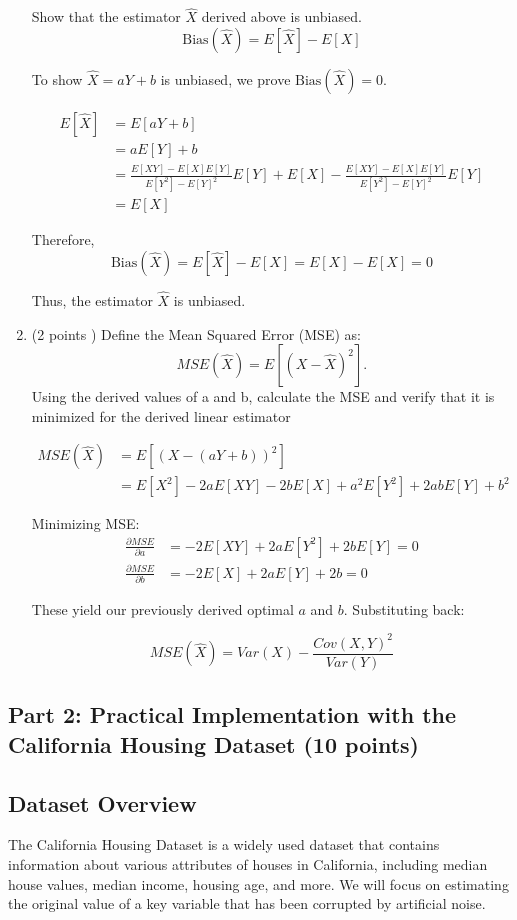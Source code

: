 \documentclass{article}
\begin{document}
\begin{enumerate}
    
    Show that the estimator \( \hat{X} \) derived above is unbiased.
\[\text{Bias}(\hat{X}) = E[\hat{X}] - E[X]\]

To show $\hat{X} = aY + b$ is unbiased, we prove $\text{Bias}(\hat{X}) = 0$.


\begin{align*}
E[\hat{X}] &= E[aY + b] \\
&= aE[Y] + b \\
&= \frac{E[XY] - E[X]E[Y]}{E[Y^2] - E[Y]^2} E[Y] + E[X] - \frac{E[XY] - E[X]E[Y]}{E[Y^2] - E[Y]^2} E[Y] \\
&= E[X]
\end{align*}

Therefore,
\[\text{Bias}(\hat{X}) = E[\hat{X}] - E[X] = E[X] - E[X] = 0\]


Thus, the estimator $\hat{X}$ is unbiased.    
\item (2 points ) Define the Mean Squared Error (MSE) as:
\[
    MSE(\hat{X}) = E[(X - \hat{X})^2].
\]
Using the derived values of a and b, calculate the MSE and verify that it is minimized for the
derived linear estimator

\begin{align*}
MSE(\hat{X}) &= E[(X - (aY + b))^2] \\
&= E[X^2] - 2aE[XY] - 2bE[X] + a^2E[Y^2] + 2abE[Y] + b^2
\end{align*}

Minimizing MSE:
\begin{align*}
\frac{\partial MSE}{\partial a} &= -2E[XY] + 2aE[Y^2] + 2bE[Y] = 0 \\
\frac{\partial MSE}{\partial b} &= -2E[X] + 2aE[Y] + 2b = 0
\end{align*}

These yield our previously derived optimal $a$ and $b$. Substituting back:

\[MSE(\hat{X}) = Var(X) - \frac{Cov(X,Y)^2}{Var(Y)}\]

\end{enumerate}

\subsection*{Part 2: Practical Implementation with the California Housing Dataset (10 points)}

\subsection*{Dataset Overview}
The California Housing Dataset is a widely used dataset that contains information about various attributes of houses in California, including median house values, median income, housing age, and more. We will focus on estimating the original value of a key variable that has been corrupted by artificial noise.
\end{document}

